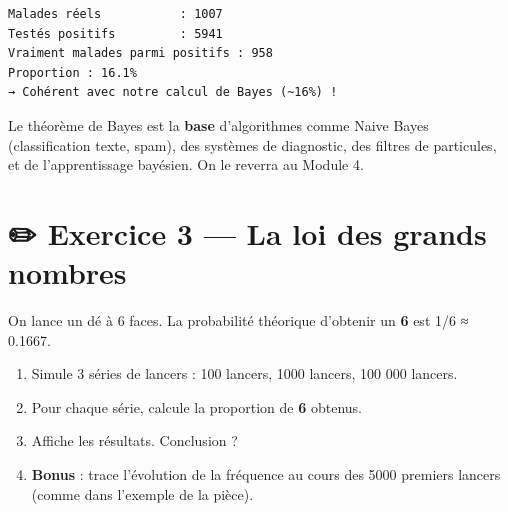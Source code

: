 \documentclass[
  french,
  11pt,
  a4paper,
]{scrbook}
\providecommand{\tightlist}{%
  \setlength{\itemsep}{0pt}\setlength{\parskip}{0pt}}
\begin{document}
\begin{verbatim}
Malades réels           : 1007
Testés positifs         : 5941
Vraiment malades parmi positifs : 958
Proportion : 16.1%
→ Cohérent avec notre calcul de Bayes (~16%) !
\end{verbatim}

\begin{tcolorbox}[enhanced jigsaw, arc=.35mm, bottomrule=.15mm, bottomtitle=1mm, breakable, colback=white, colbacktitle=quarto-callout-important-color!10!white, colframe=quarto-callout-important-color-frame, coltitle=black, left=2mm, leftrule=.75mm, opacityback=0, opacitybacktitle=0.6, rightrule=.15mm, title=\textcolor{quarto-callout-important-color}{\faExclamation}\hspace{0.5em}{🧠 Pourquoi Bayes est central en IA}, titlerule=0mm, toprule=.15mm, toptitle=1mm]

Le théorème de Bayes est la \textbf{base} d'algorithmes comme Naive
Bayes (classification texte, spam), des systèmes de diagnostic, des
filtres de particules, et de l'apprentissage bayésien. On le reverra au
Module 4.

\end{tcolorbox}

\section{✏️ Exercice 3 --- La loi des grands
nombres}\label{exercice-3-la-loi-des-grands-nombres}

\begin{tcolorbox}[enhanced jigsaw, arc=.35mm, bottomrule=.15mm, bottomtitle=1mm, breakable, colback=white, colbacktitle=quarto-callout-note-color!10!white, colframe=quarto-callout-note-color-frame, coltitle=black, left=2mm, leftrule=.75mm, opacityback=0, opacitybacktitle=0.6, rightrule=.15mm, title={📝 Énoncé}, titlerule=0mm, toprule=.15mm, toptitle=1mm]

On lance un dé à 6 faces. La probabilité théorique d'obtenir un
\textbf{6} est 1/6 ≈ 0.1667.

\begin{enumerate}
\def\labelenumi{\arabic{enumi}.}
\tightlist
\item
  Simule 3 séries de lancers : 100 lancers, 1000 lancers, 100 000
  lancers.
\item
  Pour chaque série, calcule la proportion de \textbf{6} obtenus.
\item
  Affiche les résultats. Conclusion ?
\item
  \textbf{Bonus} : trace l'évolution de la fréquence au cours des 5000
  premiers lancers (comme dans l'exemple de la pièce).
\end{enumerate}

\end{tcolorbox}
\end{document}
